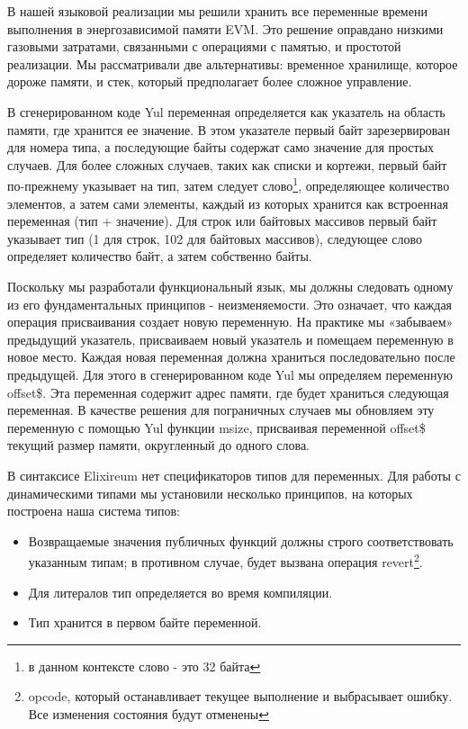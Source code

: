 В нашей языковой реализации мы решили хранить все переменные времени выполнения в энергозависимой памяти EVM. Это решение оправдано низкими газовыми затратами, связанными с операциями с памятью, и простотой реализации. Мы рассматривали две альтернативы: временное хранилище, которое дороже памяти, и стек, который предполагает более сложное управление.

В сгенерированном коде Yul переменная определяется как указатель на область памяти, где хранится ее значение. В этом указателе первый байт зарезервирован для номера типа, а последующие байты содержат само значение для простых случаев. Для более сложных случаев, таких как списки и кортежи, первый байт по-прежнему указывает на тип, затем следует слово\footnote{в данном контексте слово - это 32 байта}, определяющее количество элементов, а затем сами элементы, каждый из которых хранится как встроенная переменная (тип + значение). Для строк или байтовых массивов первый байт указывает тип (1 для строк, 102 для байтовых массивов), следующее слово определяет количество байт, а затем собственно байты.

Поскольку мы разработали функциональный язык, мы должны следовать одному из его фундаментальных принципов - неизменяемости. Это означает, что каждая операция присваивания создает новую переменную. На практике мы «забываем» предыдущий указатель, присваиваем новый указатель и помещаем переменную в новое место. Каждая новая переменная должна храниться последовательно после предыдущей. Для этого в сгенерированном коде Yul мы определяем переменную offset\$. Эта переменная содержит адрес памяти, где будет храниться следующая переменная. В качестве решения для пограничных случаев мы обновляем эту переменную с помощью Yul функции msize, присваивая переменной offset\$ текущий размер памяти, округленный до одного слова.

В синтаксисе Elixireum нет спецификаторов типов для переменных. Для работы с динамическими типами мы установили несколько принципов, на которых построена наша система типов:
\begin{itemize}
  \item Возвращаемые значения публичных функций должны строго соответствовать указанным типам; в противном случае, будет вызвана операция revert\footnote{opcode, который останавливает текущее выполнение и выбрасывает ошибку. Все изменения состояния будут отменены}.
  \item Для литералов тип определяется во время компиляции.
  \item Тип хранится в первом байте переменной.
\end{itemize}

